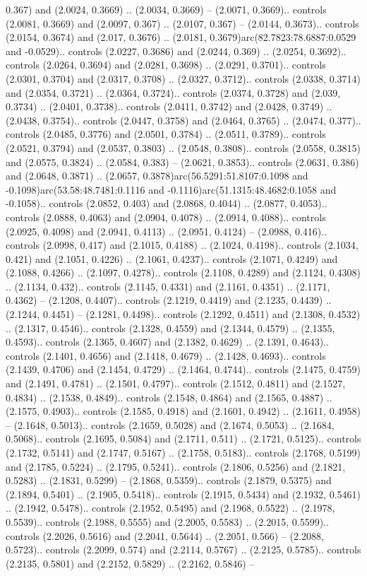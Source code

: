 0.367) and (2.0024, 0.3669) .. (2.0034, 0.3669) -- (2.0071, 0.3669).. controls (2.0081, 0.3669) and (2.0097, 0.367) .. (2.0107, 0.367) -- (2.0144, 0.3673).. controls (2.0154, 0.3674) and (2.017, 0.3676) .. (2.0181, 0.3679)arc(82.7823:78.6887:0.0529 and -0.0529).. controls (2.0227, 0.3686) and (2.0244, 0.369) .. (2.0254, 0.3692).. controls (2.0264, 0.3694) and (2.0281, 0.3698) .. (2.0291, 0.3701).. controls (2.0301, 0.3704) and (2.0317, 0.3708) .. (2.0327, 0.3712).. controls (2.0338, 0.3714) and (2.0354, 0.3721) .. (2.0364, 0.3724).. controls (2.0374, 0.3728) and (2.039, 0.3734) .. (2.0401, 0.3738).. controls (2.0411, 0.3742) and (2.0428, 0.3749) .. (2.0438, 0.3754).. controls (2.0447, 0.3758) and (2.0464, 0.3765) .. (2.0474, 0.377).. controls (2.0485, 0.3776) and (2.0501, 0.3784) .. (2.0511, 0.3789).. controls (2.0521, 0.3794) and (2.0537, 0.3803) .. (2.0548, 0.3808).. controls (2.0558, 0.3815) and (2.0575, 0.3824) .. (2.0584, 0.383) -- (2.0621, 0.3853).. controls (2.0631, 0.386) and (2.0648, 0.3871) .. (2.0657, 0.3878)arc(56.5291:51.8107:0.1098 and -0.1098)arc(53.58:48.7481:0.1116 and -0.1116)arc(51.1315:48.4682:0.1058 and -0.1058).. controls (2.0852, 0.403) and (2.0868, 0.4044) .. (2.0877, 0.4053).. controls (2.0888, 0.4063) and (2.0904, 0.4078) .. (2.0914, 0.4088).. controls (2.0925, 0.4098) and (2.0941, 0.4113) .. (2.0951, 0.4124) -- (2.0988, 0.416).. controls (2.0998, 0.417) and (2.1015, 0.4188) .. (2.1024, 0.4198).. controls (2.1034, 0.421) and (2.1051, 0.4226) .. (2.1061, 0.4237).. controls (2.1071, 0.4249) and (2.1088, 0.4266) .. (2.1097, 0.4278).. controls (2.1108, 0.4289) and (2.1124, 0.4308) .. (2.1134, 0.432).. controls (2.1145, 0.4331) and (2.1161, 0.4351) .. (2.1171, 0.4362) -- (2.1208, 0.4407).. controls (2.1219, 0.4419) and (2.1235, 0.4439) .. (2.1244, 0.4451) -- (2.1281, 0.4498).. controls (2.1292, 0.4511) and (2.1308, 0.4532) .. (2.1317, 0.4546).. controls (2.1328, 0.4559) and (2.1344, 0.4579) .. (2.1355, 0.4593).. controls (2.1365, 0.4607) and (2.1382, 0.4629) .. (2.1391, 0.4643).. controls (2.1401, 0.4656) and (2.1418, 0.4679) .. (2.1428, 0.4693).. controls (2.1439, 0.4706) and (2.1454, 0.4729) .. (2.1464, 0.4744).. controls (2.1475, 0.4759) and (2.1491, 0.4781) .. (2.1501, 0.4797).. controls (2.1512, 0.4811) and (2.1527, 0.4834) .. (2.1538, 0.4849).. controls (2.1548, 0.4864) and (2.1565, 0.4887) .. (2.1575, 0.4903).. controls (2.1585, 0.4918) and (2.1601, 0.4942) .. (2.1611, 0.4958) -- (2.1648, 0.5013).. controls (2.1659, 0.5028) and (2.1674, 0.5053) .. (2.1684, 0.5068).. controls (2.1695, 0.5084) and (2.1711, 0.511) .. (2.1721, 0.5125).. controls (2.1732, 0.5141) and (2.1747, 0.5167) .. (2.1758, 0.5183).. controls (2.1768, 0.5199) and (2.1785, 0.5224) .. (2.1795, 0.5241).. controls (2.1806, 0.5256) and (2.1821, 0.5283) .. (2.1831, 0.5299) -- (2.1868, 0.5359).. controls (2.1879, 0.5375) and (2.1894, 0.5401) .. (2.1905, 0.5418).. controls (2.1915, 0.5434) and (2.1932, 0.5461) .. (2.1942, 0.5478).. controls (2.1952, 0.5495) and (2.1968, 0.5522) .. (2.1978, 0.5539).. controls (2.1988, 0.5555) and (2.2005, 0.5583) .. (2.2015, 0.5599).. controls (2.2026, 0.5616) and (2.2041, 0.5644) .. (2.2051, 0.566) -- (2.2088, 0.5723).. controls (2.2099, 0.574) and (2.2114, 0.5767) .. (2.2125, 0.5785).. controls (2.2135, 0.5801) and (2.2152, 0.5829) .. (2.2162, 0.5846) -- 